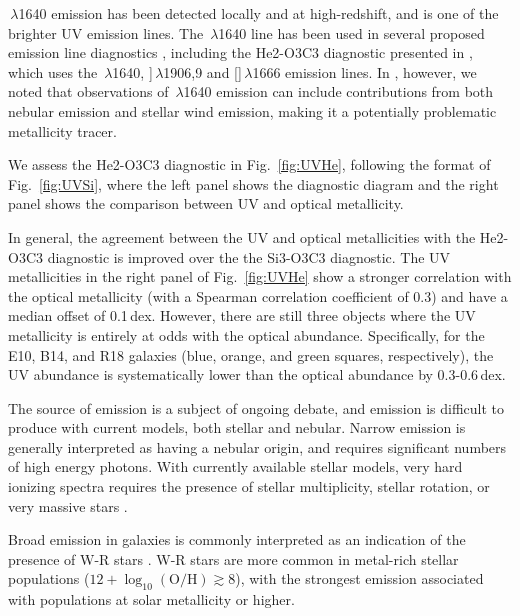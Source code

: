 \documentclass[preprint2]{aastex62}
\newcommand{\oiii}{[\ion{O}{3}]}
\newcommand{\heii}{\ion{He}{2}}
\newcommand{\ciii}{\ion{C}{3}]}
\newcommand{\logten}{\ensuremath{\log_{10}}}
\newcommand{\logOH}{\ensuremath{\logten (\mathrm{O}/\mathrm{H})}\xspace}
\begin{document}
\heii$\,\lambda$1640 emission has been detected locally and at high-redshift, and is one of the brighter UV emission lines. The \heii$\,\lambda$1640 line has been used in several proposed emission line diagnostics \citep[e.g.,][]{Jaskot+2016, Feltre+2016}, including the He2-O3C3 diagnostic presented in , which uses the \heii$\,\lambda$1640, \ciii$\,\lambda$1906,9 and \oiii$\,\lambda$1666 emission lines. In , however, we noted that observations of \heii$\,\lambda$1640 emission can include contributions from both nebular emission and stellar wind emission, making it a potentially problematic metallicity tracer.

We assess the He2-O3C3 diagnostic in Fig.~\ref{fig:UVHe}, following the format of Fig.~\ref{fig:UVSi}, where the left panel shows the diagnostic diagram and the right panel shows the comparison between UV and optical metallicity.

In general, the agreement between the UV and optical metallicities with the He2-O3C3 diagnostic is improved over the the Si3-O3C3 diagnostic. The UV metallicities in the right panel of Fig.~\ref{fig:UVHe} show a stronger correlation with the optical metallicity (with a Spearman correlation coefficient of 0.3) and have a median offset of 0.1\,dex. However, there are still three objects where the UV metallicity is entirely at odds with the optical abundance. Specifically, for the E10, B14, and R18 galaxies (blue, orange, and green squares, respectively), the UV abundance is systematically lower than the optical abundance by 0.3-0.6\,dex.

The source of  emission is a subject of ongoing debate, and  emission is difficult to produce with current models, both stellar and nebular. Narrow  emission is generally interpreted as having a nebular origin, and requires significant numbers of high energy photons. With currently available stellar models, very hard ionizing spectra requires the presence of stellar multiplicity, stellar rotation, or very massive stars \citep[e.g.,][]{Stark+2014, Steidel+2016, Byler+2017, Choi+2017}. 

Broad  emission in galaxies is commonly interpreted as an indication of the presence of W-R stars \citep[e.g., ][]{Kunth+1985, Conti+1991, Schaerer+1999, Brinchmann+2008}. W-R stars are more common in metal-rich stellar populations ($12+\logOH \gtrsim 8$), with the strongest  emission associated with populations at solar metallicity or higher. 
\end{document}
